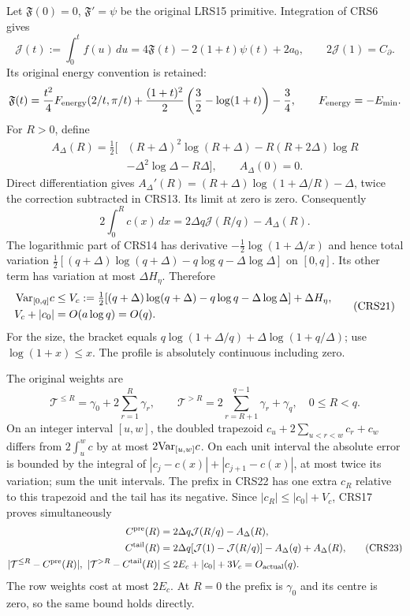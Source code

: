 Let $\mathfrak F(0)=0$, $\mathfrak F'=\psi$ be the original LRS15
primitive. Integration of CRS6 gives
\[
 \mathcal J(t):=\int_0^t f(u)\,du
 =4\mathfrak F(t)-2(1+t)\psi(t)+2a_0,\qquad
 2\mathcal J(1)=C_\partial.                            \tag{CRS18}
\]
Its original energy convention is retained:
\[
 \mathfrak F(t)=\frac{t^2}{4}F_{\rm energy}(2/t,\pi/t)
 +\frac{(1+t)^2}{2}\left(\frac32-\log(1+t)\right)-\frac34,
 \qquad F_{\rm energy}=-E_{\min}.
\]
For $R>0$, define
\[
\begin{split}
 A_\Delta(R)=\tfrac12[&(R+\Delta)^2\log(R+\Delta)
       -R(R+2\Delta)\log R\\
       &-\Delta^2\log\Delta-R\Delta],\qquad A_\Delta(0)=0 .
\end{split}                                                    \tag{CRS19}
\]
Direct differentiation gives
$A_\Delta'(R)=(R+\Delta)\log(1+\Delta/R)-\Delta$,
twice the correction subtracted in CRS13. Its limit at zero is zero.
Consequently
\[
 2\int_0^R c(x)\,dx=2\Delta q\mathcal J(R/q)-A_\Delta(R).
                                                               \tag{CRS20}
\]
The logarithmic part of CRS14 has derivative
$-\tfrac12\log(1+\Delta/x)$ and hence total variation
$\tfrac12[(q+\Delta)\log(q+\Delta)-q\log q-\Delta\log\Delta]$
on $[0,q]$. Its other term has variation at most $\Delta H_\eta$.
Therefore
\[
\begin{split}
 {\rm Var}_{[0,q]}c&\le V_c
 :=\tfrac12[(q+\Delta)\log(q+\Delta)-q\log q-\Delta\log\Delta]
                                    +\Delta H_\eta,\\
 V_c+|c_0|&=O(a\log q)=O(q).
\end{split}                                                    \tag{CRS21}
\]
For the size, the bracket equals
$q\log(1+\Delta/q)+\Delta\log(1+q/\Delta)$; use
$\log(1+x)\le x$. The profile is absolutely continuous including zero.

The original weights are
\[
 \mathcal T^{\le R}=\gamma_0+2\sum_{r=1}^R\gamma_r,\qquad
 \mathcal T^{>R}=2\sum_{r=R+1}^{q-1}\gamma_r+\gamma_q,\quad 0\le R<q .
                                                               \tag{CRS22}
\]
On an integer interval $[u,w]$, the doubled trapezoid
$c_u+2\sum_{u<r<w}c_r+c_w$ differs from $2\int_u^w c$
by at most $2{\rm Var}_{[u,w]}c$. On each unit interval the
absolute error is bounded by the integral of
$|c_j-c(x)|+|c_{j+1}-c(x)|$, at most twice its variation;
sum the unit intervals. The prefix in CRS22 has one extra
$c_R$ relative to this trapezoid and the tail has its negative.
Since $|c_R|\le|c_0|+V_c$, CRS17 proves simultaneously
\[
\begin{split}
 C^{\rm pre}(R)&=2\Delta q\mathcal J(R/q)-A_\Delta(R),\\
 C^{\rm tail}(R)&=2\Delta q[\mathcal J(1)-\mathcal J(R/q)]
                                    -A_\Delta(q)+A_\Delta(R),\\
 |\mathcal T^{\le R}-C^{\rm pre}(R)|,\
 |\mathcal T^{>R}-C^{\rm tail}(R)|
 &\le2E_c+|c_0|+3V_c=O_{\rm actual}(q).
\end{split}                                                    \tag{CRS23}
\]
The row weights cost at most $2E_c$. At $R=0$ the prefix is
$\gamma_0$ and its centre is zero, so the same bound holds directly.

